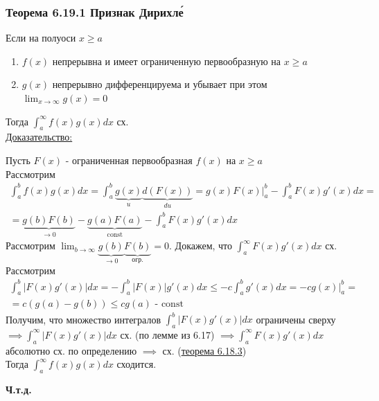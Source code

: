 \documentclass[12pt]{article}
\begin{document}
    \subsubsection*{Теорема 6.19.1 Признак Дирихле́}\label{th:6.19.1}
    Если на полуоси $x\geq a$
    \begin{enumerate}
        \item $f(x)$ непрерывна и имеет ограниченную первообразную на $x\geq a$
        \item $g(x)$ непрерывно дифференцируема и убывает при этом $\lim_{x \to \infty}g(x)=0$
    \end{enumerate}
    Тогда $\int_{a}^{\infty}f(x)g(x)dx$ сх.\\
    \underline{Доказательство:}
    \begin{adjustwidth}{1.5em}{1.5em}
        Пусть $F(x)$ - ограниченная первообразная $f(x)$ на $x \geq a$\\
        Рассмотрим 
        \begin{gather*}
            \int_{a}^{b}f(x)g(x)dx=\int_{a}^{b}\underbrace{g(x)}_{u} \underbrace{d(F(x))}_{du}=g(x)F(x)\Big|^b_a-\int_{a}^{b}F(x)g'(x)dx =\\
            = \underbrace{g(b)F(b)}_{\to 0}-\underbrace{g(a)F(a)}_{\text{const}}-\int_{a}^{b}F(x)g'(x)dx
        \end{gather*}
        Рассмотрим $\lim_{b \to \infty}\underbrace{g(b)}_{\to 0} \underbrace{F(b)}_{\text{огр.}}=0$. Докажем, что $\int_{a}^{\infty}F(x)g'(x)dx$ сх.\\
        Рассмотрим 
        \begin{gather*}
            \int_{a}^{b}|F(x)g'(x)|dx=-\int_{a}^{b}|F(x)|g'(x)dx \leq -c \int_{a}^{b}g'(x)dx=-c g(x)\Big|^b_a =\\
            = c(g(a)-g(b))\leq cg(a) \text{ - const}
        \end{gather*}
        Получим, что множество интегралов $\int_{a}^{b}|F(x)g'(x)|dx$ ограничены сверху $\implies \int_{a}^{\infty}|F(x)g'(x)|dx$ сх. (по лемме из 6.17) $\implies \int_{a}^{\infty}F(x)g'(x)dx$ абсолютно сх. по определению $\implies$ сх. (\hyperref[th:6.18.3]{теорема 6.18.3})\\
        Тогда $\int_{a}^{\infty}f(x)g(x)dx$ сходится.
        \begin{center}
            \textbf{Ч.т.д.}
        \end{center}
    \end{adjustwidth}
\end{document}
